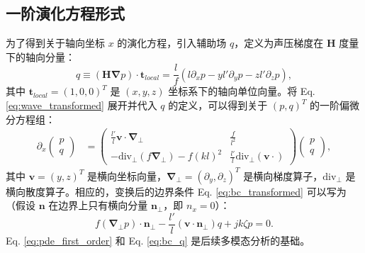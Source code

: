 \documentclass{ctexart}
\begin{document}
\subsection{一阶演化方程形式}
为了得到关于轴向坐标 $x$ 的演化方程，引入辅助场 $q$，定义为声压梯度在 $\mathbf{H}$ 度量下的轴向分量：
\begin{equation} \label{eq:q_definition}
q \equiv (\mathbf{H} \boldsymbol{\nabla} p) \cdot \mathbf{t}_{local} = \frac{l}{f} (l \partial_x p - yl' \partial_y p - zl' \partial_z p),
\end{equation}
其中 $\mathbf{t}_{local} = (1, 0, 0)^T$ 是 $(x,y,z)$ 坐标系下的轴向单位向量。将 Eq. \eqref{eq:wave_transformed} 展开并代入 $q$ 的定义，可以得到关于 $(p, q)^T$ 的一阶偏微分方程组：
\begin{align} \label{eq:pde_first_order}
\partial_x
\begin{pmatrix} p \\
q \end{pmatrix}
&=
\begin{pmatrix}
\frac{l'}{l} \mathbf{v} \cdot \boldsymbol{\nabla}_\perp & \frac{f}{l^2} \\
-\text{div}_\perp(f \boldsymbol{\nabla}_\perp) - f(kl)^2 & \frac{l'}{l} \text{div}_\perp(\mathbf{v} \cdot)
\end{pmatrix}
\begin{pmatrix} p \\
q \end{pmatrix} ,
\end{align}
其中 $\mathbf{v} = (y, z)^T$ 是横向坐标向量，$\boldsymbol{\nabla}_\perp = (\partial_y, \partial_z)^T$ 是横向梯度算子，$\text{div}_\perp$ 是横向散度算子。相应的，变换后的边界条件 Eq. \eqref{eq:bc_transformed} 可以写为（假设 $\mathbf{n}$ 在边界上只有横向分量 $\mathbf{n}_\perp$，即 $n_x=0$）：
\begin{equation} \label{eq:bc_q}
f (\boldsymbol{\nabla}_\perp p) \cdot \mathbf{n}_\perp - \frac{l'}{l} (\mathbf{v} \cdot \mathbf{n}_\perp) q + jk\zeta p = 0.
\end{equation}
Eq. \eqref{eq:pde_first_order} 和 Eq. \eqref{eq:bc_q} 是后续多模态分析的基础。
\end{document}
